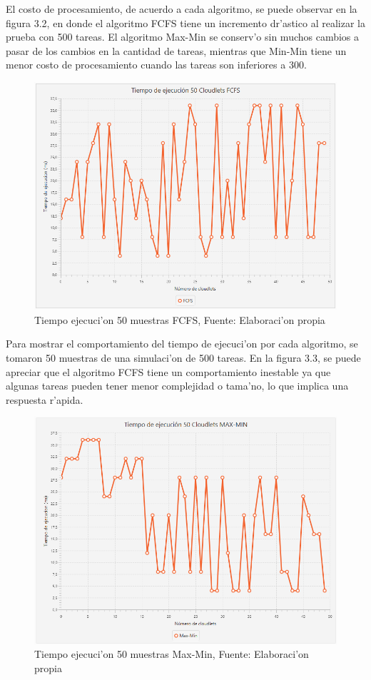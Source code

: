 El costo de procesamiento, de acuerdo a cada algoritmo, se puede observar en la figura 3.2, en donde el algoritmo FCFS tiene un incremento dr'astico al realizar la prueba con 500 tareas. El algoritmo Max-Min se conserv'o sin muchos cambios a pasar de los cambios en la cantidad de tareas, mientras que Min-Min tiene un menor costo de procesamiento cuando las tareas son inferiores a 300.

\vspace{20em} 

\begin{figure}[H] 
	\caption{Tiempo ejecuci'on 50 muestras FCFS, Fuente: Elaboraci'on propia}
	\centering
	\includegraphics[scale=0.5]{media/fcfs}
\end{figure}


Para mostrar el comportamiento del tiempo de ejecuci'on por cada algoritmo, se tomaron 50 muestras de una simulaci'on de 500 tareas. En la figura 3.3, se puede apreciar que el algoritmo FCFS tiene un comportamiento inestable ya que algunas tareas pueden tener menor complejidad o tama'no, lo que implica una respuesta r'apida.

\begin{figure}[H] 
	\caption{Tiempo ejecuci'on 50 muestras Max-Min, Fuente: Elaboraci'on propia}
	\centering
	\includegraphics[scale=0.5]{media/max-min}
\end{figure}


